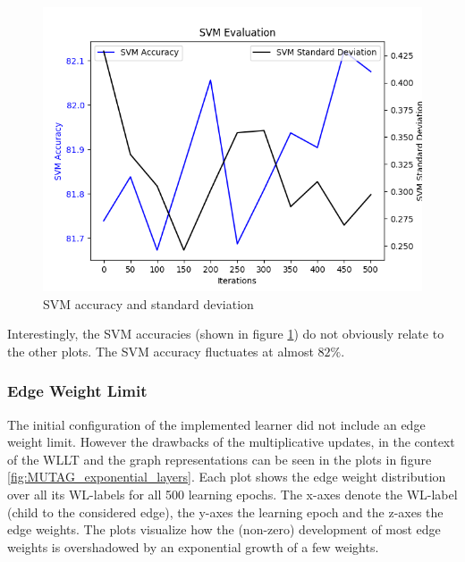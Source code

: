 		\begin{figure}[H]
			\centering
			\includegraphics[width=0.7\linewidth]{images/plotA1_SVM_ogbgMolbaceExp1}
			\caption{SVM accuracy and standard deviation}
			\label{fig:plota1svmogbgmolbaceexp1}
		\end{figure}
		
		Interestingly, the SVM accuracies (shown in figure \ref{fig:plota1svmogbgmolbaceexp1}) do not obviously relate to the other plots.
		The SVM accuracy fluctuates at almost $82\%$.
	
	\subsubsection{Edge Weight Limit} \label{subsubsec:exp_WeightLimit}
		
		The initial configuration of the implemented learner did not include an edge weight limit.
		However the drawbacks of the multiplicative updates, in the context of the WLLT and the graph representations can be seen in the plots in figure \ref{fig:MUTAG_exponential_layers}.
		Each plot shows the edge weight distribution over all its WL-labels for all 500 learning epochs.
		The x-axes denote the WL-label (child to the considered edge), the y-axes the learning epoch and the z-axes the edge weights.
		The plots visualize how the (non-zero) development of most edge weights is overshadowed by an exponential growth of a few weights.
				
